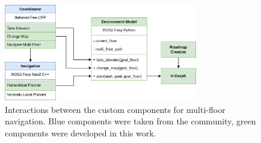 \begin{figure}[h]
    \centering
    \includegraphics[width=0.75\textwidth]{figures/40_concept/concept_uml.png}
    \caption[Interactions between the custom components for multi-floor navigation]{Interactions between the custom components for multi-floor navigation. Blue components were taken from the community, green components were developed in this work.}
    \label{fig:concept_uml}
\end{figure}

